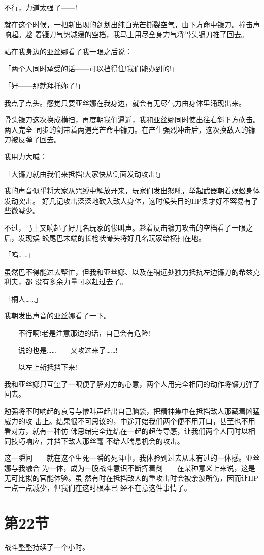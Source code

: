 \documentclass[11pt]{book}
\begin{document}
不行，力道太强了——!

就在这个时候，一把新出现的剑划出纯白光芒撕裂空气，由下方命中镰刀。撞击声响起。趁
着镰刀气势减缓的空档，我马上用尽全身力气将骨头镰刀推了回去。

站在我身边的亚丝娜看了我一眼之后说：

「两个人同时承受的话——可以挡得住!我们能办到的!」

「好——那就拜托妳了!」

我点了点头。感觉只要亚丝娜在我身边，就会有无尽气力由身体里涌现出来。

骨头镰刀这次换成横扫，再度朝我们逼近，我和亚丝娜同时使出往右斜下方砍击。两人完全
同步的剑带着两道光芒命中镰刀。在产生强烈冲击后，这次换敌人的镰刀被反弹了回去。

我用力大喊：

「大镰刀就由我们来抵挡!大家快从侧面发动攻击!」

我的声音似乎将大家从咒缚中解放开来，玩家们发出怒吼，举起武器朝着娱蚣身体发动突击。
好几记攻击深深地砍入敌人身体，这时候头目的HP条才好不容易有了些微减少。

不过，马上又响起了好几名玩家的惨叫声。趁着反击镰刀攻击的空档看了一眼之后，发现娱
蚣尾巴末端的长枪状骨头将好几名玩家给横扫在地。

「呜……」

虽然巴不得能过去帮忙，但我和亚丝娜、以及在稍远处独力抵抗左边镰刀的希兹克利夫，都
没有多余力量可以赶过去了。

「桐人……」

我朝发出声音的亚丝娜看了一下。

——不行啊!老是注意那边的话，自己会有危险!

——说的也是……——又攻过来了……!

——以左上斩抵挡下来!

我和亚丝娜只互望了一眼便了解对方的心意，两个人用完全相同的动作将镰刀弹了回去。

勉强将不时响起的哀号与惨叫声赶出自己脑袋，把精神集中在抵挡敌人那藏着凶猛威力的攻
击上。结果很不可思议的，中途开始我们两个便不用开口，甚至也不用看对方，就有一种仿
佛思绪完全连结在一起的超传导感，让我们两个人同时以相同技巧响应，并挡下敌人那丝毫
不给人喘息机会的攻击。

这一瞬间——就在这个生死一瞬的死斗中，我体验到过去从未有过的一体感。亚丝娜与我融合
为一体，成为一股战斗意识不断挥着剑——在某种意义上来说，这是无可比拟的官能体验。虽
然有时在抵挡敌人的重攻击时会被余波所伤，因而让HP一点一点减少，但我们在这时根本已
经不在意这件事情了。
\section{第22节}
\label{sec:org84151be}
战斗整整持续了一个小时。
\end{document}
